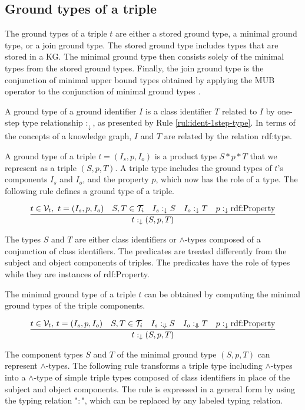 \documentclass[runningheads]{llncs}
\newcommand{\darr}{\downarrow}
\newcommand{\Darr}{\Downarrow}
\newcommand{\V}{{\cal V}}
\newcommand{\T}{{\cal T}}
\begin{document}
\subsection{Ground types of a triple\label{sec:3-ground-types}}

\noindent
The ground types of a triple $t$ are either a stored ground type, a
minimal ground type, or a join ground type. The stored ground type
includes types that are stored in a KG. The minimal ground type then
consists solely of the minimal types from the stored ground
types. Finally, the join ground type is the conjunction of minimal
upper bound types obtained by applying the MUB operator to the conjunction
of minimal ground types \cite{Knudstorp2024}.
 
A ground type of a ground identifier $I$ is a class identifier $T$
related to $I$ by one-step type relationship $:_\darr$, as presented
by Rule \ref{rul:ident-1step-type}. In terms of the concepts of a
knowledge graph, $I$ and $T$ are related by the relation rdf:type.

A ground type of a triple $t=(I_s,p,I_o)$ is a product type
$S*p*T$ that we represent as a triple $(S,p,T)$. A triple type
includes the ground types of $t$'s components $I_s$ and $I_o$, and the
property $p$, which now has the role of a type. The following rule defines a ground type of a triple.

\begin{equation}
\label{rul:3-ground}
\dfrac{t\in\V_t,\ t=(I_s,p,I_o)\quad S,T\in\T_i\quad I_s:_\darr\/S\quad I_o:_\darr\/T\quad p:_\darr\text{rdf:Property}}
      {t:_\darr(S,p,T)}
\end{equation}

The types $S$ and $T$ are either class identifiers or $\land$-types
composed of a conjunction of class identifiers. The predicates are
treated differently from the subject and object components of
triples. The predicates have the role of types while they are
instances of rdf:Property.

The minimal ground type of a triple $t$ can be obtained by computing
the minimal ground types of the triple components.

\begin{equation}
\label{rul:3-min-ground}
\dfrac{t\in\V_t,\, t=(I_s,p,I_o)\quad S,T\in\T_i\quad I_s:_\Darr\/S\quad I_o:_\Darr\/T\quad p:_\darr\text{rdf:Property}}
      {t:_\darr\/(S,p,T)}
\end{equation}

The component types $S$ and $T$ of the minimal ground type $(S,p,T)$
can represent $\land$-types. The following rule transforms a triple
type including $\land$-types into a $\land$-type of simple triple
types composed of class identifiers in place of the subject and object
components. The rule is expressed in a general form by using the
typing relation "$:$", which can be replaced by any labeled typing
relation.
\end{document}
